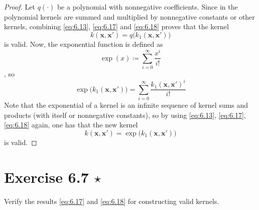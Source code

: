 \begin{proof}
    Let $q(\cdot)$ be a polynomial with nonnegative coefficients. Since in the polynomial
    kernels are summed and multiplied by nonnegative constants or other kernels, combining
    \eqref{eq:6.13}, \eqref{eq:6.17} and \eqref{eq:6.18} proves that
    the kernel
    \begin{equation}\label{eq:6.15}\tag{6.15}
        k(\mathbf{x}, \mathbf{x}') = q\big(k_1(\mathbf{x}, \mathbf{x}')\big)
    \end{equation}
    is valid. Now, the exponential function is defined as
    \[
        \exp(x) \coloneqq \sum_{i=0}^{\infty} \frac{x^i}{i!} 
    \],
    so
    \[
        \exp\big(k_1(\mathbf{x}, \mathbf{x}')\big)
        = \sum_{i=0}^{\infty} \frac{k_1(\mathbf{x}, \mathbf{x}')^i}{i!}
    \] 
    Note that the exponential of a kernel is an infinite sequence of kernel sums
    and products (with itself or nonnegative constants), so by using
    \eqref{eq:6.13}, \eqref{eq:6.17}, \eqref{eq:6.18} again, one has that
    the new kernel
    \begin{equation}\label{eq:6.16}\tag{6.16}
        k(\mathbf{x}, \mathbf{x}') = \exp\big(k_1(\mathbf{x}, \mathbf{x}')\big)
    \end{equation}
    is valid.
\end{proof}

\section*{Exercise 6.7 $\star$}
Verify the results \eqref{eq:6.17} and \eqref{eq:6.18} for constructing valid kernels.

\vspace{1em}

